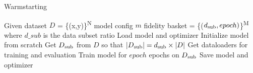 \documentclass[a4paper,11pt]{article}
\begin{document}
 
\begin{algorithm}
	\caption{Warmstarting} 
	\begin{algorithmic}[1]
            \State Given dataset $D$ = \{(x,y)\}\textsuperscript{N}
            \State model config $m$
            \State fidelity basket = \{($d\textsubscript{sub}, epoch)$\}\textsuperscript{M} where $d\_sub$ is the data subset ratio
                    \State Load model and optimizer
                \Else {}
                    \State Initialize model from scratch
                 \EndIf
            \State Get $D\textsubscript{sub}$ from $D$ so that $| D\textsubscript{sub} | = d\textsubscript{sub} \times |D| $
            \State Get dataloaders for training and evaluation
            \State Train model for $epoch$ epochs on $D\textsubscript{sub}$
            \State Save model and optimizer
		\EndFor
	\end{algorithmic} 
\end{algorithm}
\end{document}
